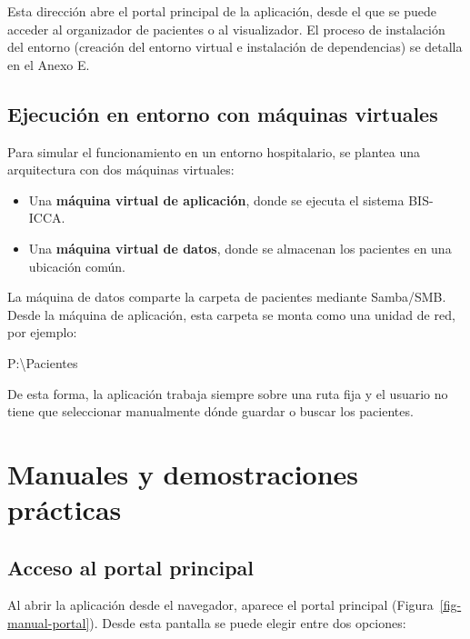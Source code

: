 \documentclass[
  spanish,
  a4paper,
  12pt,
  twoside]{memoir}
\newenvironment{Shaded}{\begin{snugshade}}{\end{snugshade}}
\newcommand{\NormalTok}[1]{\textcolor[rgb]{0.00,0.23,0.31}{#1}}
\providecommand{\tightlist}{%
  \setlength{\itemsep}{0pt}\setlength{\parskip}{0pt}}
\begin{document}
Esta dirección abre el portal principal de la aplicación, desde el que
se puede acceder al organizador de pacientes o al visualizador. El
proceso de instalación del entorno (creación del entorno virtual e
instalación de dependencias) se detalla en el Anexo E.

\section{Ejecución en entorno con máquinas
virtuales}\label{ejecuciuxf3n-en-entorno-con-muxe1quinas-virtuales}

Para simular el funcionamiento en un entorno hospitalario, se plantea
una arquitectura con dos máquinas virtuales:

\begin{itemize}
\tightlist
\item
  Una \textbf{máquina virtual de aplicación}, donde se ejecuta el
  sistema BIS-ICCA.
\item
  Una \textbf{máquina virtual de datos}, donde se almacenan los
  pacientes en una ubicación común.
\end{itemize}

La máquina de datos comparte la carpeta de pacientes mediante Samba/SMB.
Desde la máquina de aplicación, esta carpeta se monta como una unidad de
red, por ejemplo:

\begin{Shaded}
\begin{Highlighting}[]
\NormalTok{P:\textbackslash{}Pacientes}
\end{Highlighting}
\end{Shaded}

De esta forma, la aplicación trabaja siempre sobre una ruta fija y el
usuario no tiene que seleccionar manualmente dónde guardar o buscar los
pacientes.

\chapter{Manuales y demostraciones
prácticas}\label{manuales-y-demostraciones-pruxe1cticas}

\section{Acceso al portal principal}\label{acceso-al-portal-principal}

Al abrir la aplicación desde el navegador, aparece el portal principal
(Figura~\ref{fig-manual-portal}). Desde esta pantalla se puede elegir
entre dos opciones:
\end{document}
